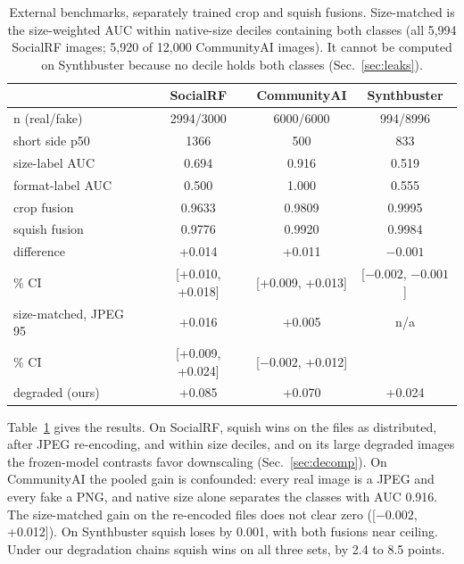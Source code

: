 \documentclass[letterpaper]{article} %
\begin{document}
\begin{table}[t]
\centering
\small
\begin{tabular}{lccc}
\toprule
 & SocialRF & CommunityAI & Synthbuster \\
\midrule
n (real/fake) & 2994/3000 & 6000/6000 & 994/8996 \\
short side p50 & 1366 & 500 & 833 \\
size-label AUC & 0.694 & 0.916 & 0.519 \\
format-label AUC & 0.500 & 1.000 & 0.555 \\
\midrule
crop fusion & 0.9633 & 0.9809 & 0.9995 \\
squish fusion & 0.9776 & 0.9920 & 0.9984 \\
difference & +0.014 & +0.011 & $-0.001$ \\
\quad 95\% CI & [+0.010, +0.018] & [+0.009, +0.013] & [$-0.002$, $-0.001$] \\
\midrule
size-matched, JPEG 95 & +0.016 & +0.005 & n/a \\
\quad 95\% CI & [+0.009, +0.024] & [$-0.002$, +0.012] & \\
degraded (ours) & +0.085 & +0.070 & +0.024 \\
\bottomrule
\end{tabular}
\caption{External benchmarks, separately trained crop and squish fusions.
Size-matched is the size-weighted AUC within native-size deciles containing
both classes (all 5,994 SocialRF images; 5,920 of 12,000 CommunityAI images). It cannot be computed on Synthbuster
because no decile holds both classes (Sec.~\ref{sec:leaks}).}
\label{tab:external}
\end{table}

Table~\ref{tab:external} gives the results. On SocialRF, squish wins on the
files as distributed, after JPEG re-encoding, and within size deciles, and on
its large degraded images the frozen-model contrasts favor downscaling
(Sec.~\ref{sec:decomp}). On CommunityAI the pooled gain is confounded: every
real image is a JPEG and every fake a PNG, and native size alone separates
the classes with AUC 0.916. The size-matched gain on the re-encoded files does
not clear zero ([$-0.002$, +0.012]). On Synthbuster squish loses by 0.001,
with both fusions near ceiling. Under our degradation chains squish wins on
all three sets, by 2.4 to 8.5 points.
\end{document}
